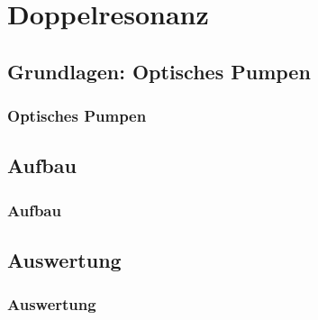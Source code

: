 
\section{Doppelresonanz}
\subsection{Grundlagen: Optisches Pumpen}
\begin{frame}
\frametitle{Optisches Pumpen}
  
\end{frame}


\subsection{Aufbau}
\begin{frame}
\frametitle{Aufbau}
  
\end{frame}

\subsection{Auswertung}
\begin{frame}
\frametitle{Auswertung}
  
\end{frame}